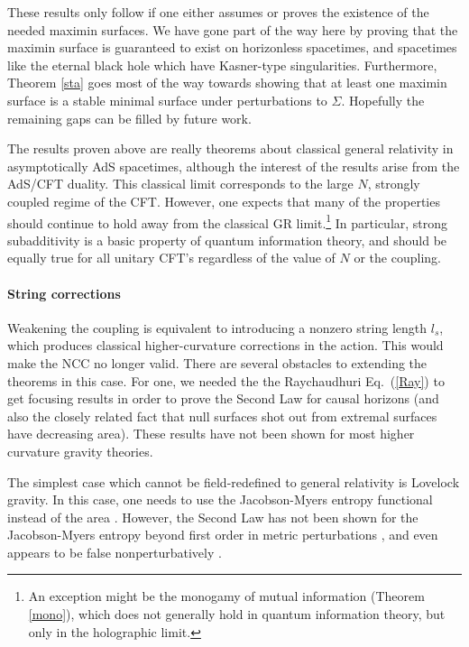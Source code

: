 \documentclass[12pt]{article}
\begin{document}
These results only follow if one either assumes or proves the existence of the needed maximin surfaces.  We have gone part of the way here by proving that the maximin surface is guaranteed to exist on horizonless spacetimes, and spacetimes like the eternal black hole which have Kasner-type singularities.  Furthermore, Theorem \ref{sta} goes most of the way towards showing that at least one maximin surface is a stable minimal surface under perturbations to $\Sigma$.  Hopefully the remaining gaps can be filled by future work.

The results proven above are really theorems about classical general relativity in asymptotically AdS spacetimes, although the interest of the results arise from the AdS/CFT duality.  This classical limit corresponds to the large $N$, strongly coupled regime of the CFT.  However, one expects that many of the properties should continue to hold away from the classical GR limit.\footnote{An exception might be the monogamy of mutual information (Theorem \ref{mono}), which does not generally hold in quantum information theory, but only in the holographic limit.} In particular, strong subadditivity is a basic property of quantum information theory, and should be equally true for all unitary CFT's regardless of the value of $N$ or the coupling.

\paragraph{String corrections} Weakening the coupling is equivalent to introducing a nonzero string length $l_s$, which produces classical higher-curvature corrections in the action.  This would make the NCC no longer valid.  There are several obstacles to extending the theorems in this case.  For one, we needed the the Raychaudhuri Eq.~(\ref{Ray}) to get focusing results in order to prove the Second Law for causal horizons (and also the closely related fact that null surfaces shot out from extremal surfaces have decreasing area).  These results have not been shown for most higher curvature gravity theories.  

The simplest case which cannot be field-redefined to general relativity is Lovelock gravity.  In this case, one needs to use the Jacobson-Myers entropy functional instead of the area \cite{JM93, dKP11, HMS11, FPS13, dong13}.  However, the Second Law has not been shown for the Jacobson-Myers entropy beyond first order in metric perturbations \cite{fLove}, and even appears to be false nonperturbatively \cite{JM93,lovelock}.
\end{document}
